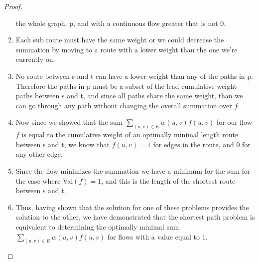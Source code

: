 \documentclass{article}
\begin{document}
\begin{proof}
\begin{enumerate}
            the whole graph, p, and with a continuous flow greater that is not 0. 
            \item Each sub route must have the same weight or we could decrease the
            summation by moving to a route with a lower weight than the one we're
            currently on. 
            \item No route between s and t can have a lower weight than any of the paths
            in p. Therefore the paths in p must be a subset of the lead cumulative weight
            paths between s and t, and since all paths share the same weight, than we can
            go through any path without changing the overall summation over \(f\). 
            \item Now since we showed that the sum \(\sum_{(u,v) \in E} w(u,v) f(u,v)\)
            for our flow \(f\) is equal to the cumulative weight of an optimally minimal
            length route between s and t, we know that \(f(u,v) = 1\) for edges in the
            route, and 0 for any other edge. 
            \item Since the flow minimizes the summation we have a minimum for the sum for
            the case where Val\((f) =1\), and this is the length of the shortest route
            between s and t. 
            \item Thus, having shown that the solution for one of these problems provides
            the solution to the other, we have demonstrated that the shortest path problem
            is equivalent to determining the optimally minimal sum \(\sum_{(u,v) \in E}
            w(u,v) f (u,v)\) for flows with a value equal to 1. 
      \end{enumerate}
\end{proof}
\end{document}
